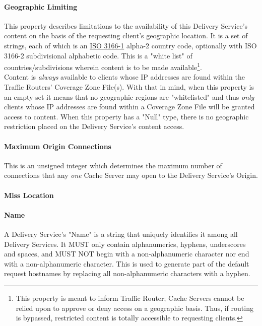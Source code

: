 \paragraph{Geographic Limiting}
This property describes limitations to the availability of this Delivery
Service's content on the basis of the requesting client's geographic location.
It is a set of strings, each of which is an
\href{https://www.iso.org/obp/ui/#search/code/}{ISO 3166-1} alpha-2 country
code, optionally with ISO 3166-2 subdivisional alphabetic code. This is a "white
list" of countries/subdivisions wherein content is to be made
available\footnote{This property is meant to inform Traffic Router; Cache
Servers cannot be relied upon to approve or deny access on a geographic basis.
Thus, if routing is bypassed, restricted content is totally accessible to
requesting clients.}.\\
Content is \emph{always} available to clients whose IP addresses are found
within the Traffic Routers' Coverage Zone File(s). With that in mind, when this
property is an empty set it means that no geographic regions are "whitelisted"
and thus \emph{only} clients whose IP addresses are found within a Coverage Zone
File will be granted access to content. When this property has a "Null" type,
there is no geographic restriction placed on the Delivery Service's content
access.

\paragraph{Maximum Origin Connections}
This is an unsigned integer which determines the maximum number of connections
that any \emph{one} Cache Server may open to the Delivery Service's Origin.


\paragraph{Miss Location}

\paragraph{Name}
A Delivery Service's "Name" is a string that uniquely identifies it among all
Delivery Services. It MUST only contain alphanumerics, hyphens, underscores and
spaces, and MUST NOT begin with a non-alphanumeric character nor end with a
non-alphanumeric character. This is used to generate part of the default request
hostnames by replacing all non-alphanumeric characters with a hyphen.

